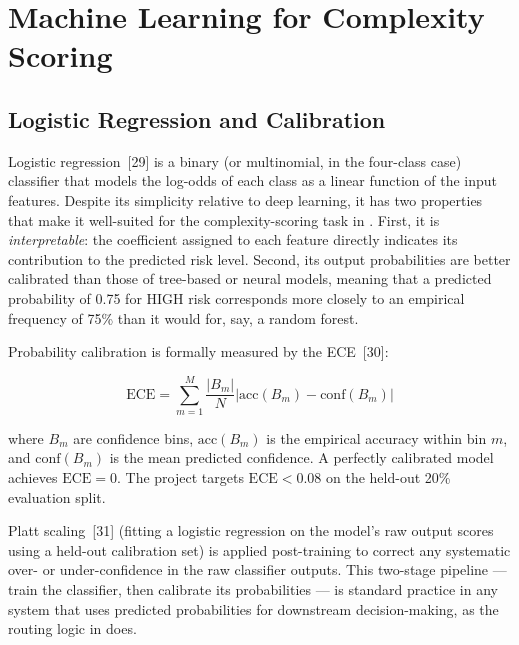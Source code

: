 \section{Machine Learning for Complexity Scoring}
\label{sec:ml-theory}

\subsection{Logistic Regression and Calibration}
\label{subsec:lr-calibration}

Logistic regression~[29] is a binary (or multinomial, in the four-class
case) classifier that models the log-odds of each class as a linear function
of the input features. Despite its simplicity relative to deep learning, it
has two properties that make it well-suited for the complexity-scoring task in
\codara{}. First, it is \emph{interpretable}: the coefficient assigned to each
feature directly indicates its contribution to the predicted risk level.
Second, its output probabilities are better calibrated than those of
tree-based or neural models, meaning that a predicted probability of 0.75 for
HIGH risk corresponds more closely to an empirical frequency of 75\% than it
would for, say, a random forest.

Probability calibration is formally measured by the \ac{ECE}~[30]:

\begin{equation}
  \mathrm{ECE} = \sum_{m=1}^{M} \frac{|B_m|}{N}
    \left| \mathrm{acc}(B_m) - \mathrm{conf}(B_m) \right|
  \label{eq:ece}
\end{equation}

where $B_m$ are confidence bins, $\mathrm{acc}(B_m)$ is the empirical accuracy
within bin $m$, and $\mathrm{conf}(B_m)$ is the mean predicted confidence.
A perfectly calibrated model achieves $\mathrm{ECE} = 0$. The project targets
$\mathrm{ECE} < 0.08$ on the held-out 20\% evaluation split.

Platt scaling~[31] (fitting a logistic regression on the model's raw output
scores using a held-out calibration set) is applied post-training to correct
any systematic over- or under-confidence in the raw classifier outputs. This
two-stage pipeline --- train the classifier, then calibrate its probabilities ---
is standard practice in any system that uses predicted probabilities for
downstream decision-making, as the routing logic in \codara{} does.

